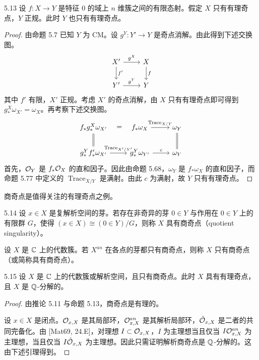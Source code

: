 
\begin{propositionp}{5.13}
设 $f\colon X\to Y$ 是特征 $0$ 的域上 $n$ 维簇之间的有限态射。假定 $X$ 只有有理奇点，$Y$ 正规。此时 $Y$ 也只有有理奇点。
\end{propositionp}

\begin{proof}
由命题 5.7 已知 $Y$ 为 CM。设 $g^Y\colon Y'\to Y$ 是奇点消解。由此得到下述交换图。
\[
\begin{tikzcd}
X' \arrow[r,"g^X"] \arrow[d,"f'"] & X \arrow[d,"f"] \\
Y' \arrow[r,"g^Y"] & Y
\end{tikzcd}
\]
其中 $f'$ 有限，$X'$ 正规。考虑 $X'$ 的奇点消解，由 $X$ 只有有理奇点即可得到 $g^X_*\omega_{X'}=\omega_X$。再考察下述交换图。
\[
\begin{tikzcd}
f_*g^X_*\omega_{X'} \arrow[r,phantom,"="] \arrow[d,equal] & f_*\omega_X \arrow[r,"\operatorname{Trace}_{X/Y}"] & \omega_Y \arrow[d,equal] \\
g^Y_*f'_*\omega_{X'} \arrow[r,"\operatorname{Trace}_{X'/Y'}"] & g^Y_*\omega_{Y'} \arrow[r,"c"] & \omega_Y
\end{tikzcd}
\]
首先，$\mathcal{O}_Y$ 是 $f_*\mathcal{O}_X$ 的直和因子。因此由命题 5.68，$\omega_Y$ 是 $f_*\omega_X$ 的直和因子，而命题 5.77 中定义的 $\operatorname{Trace}_{X/Y}$ 是满射。由此 $c$ 为满射，故 $Y$ 只有有理奇点。
\end{proof}

商奇点是值得关注的有理奇点之例。

\begin{definition}{5.14}
设 $x\in X$ 是复解析空间的芽。若存在非奇异的芽 $0\in Y$ 与作用在 $0\in Y$ 上的有限群 $G$，使得 $(x\in X)\cong(0\in Y)/G$，则称 $X$ 具有商奇点（quotient singularity）。

设 $X$ 是 $\mathbb{C}$ 上的代数簇。若 $X^{an}$ 在各点的芽都只有商奇点，则称 $X$ 只有商奇点（或简称具有商奇点）。
\end{definition}

\begin{propositionp}{5.15}
设 $X$ 是 $\mathbb{C}$ 上的代数簇或解析空间，且只有商奇点。此时 $X$ 具有有理奇点，且 $X$ 是 $\mathbb{Q}$-分解的。
\end{propositionp}

\begin{proof}
由推论 5.11 与命题 5.13，商奇点是有理的。

设 $x\in X$ 是闭点。$\mathcal{O}_{x,X}$ 是其局部环，$\mathcal{O}^{an}_{x,X}$ 是其解析局部环，$\hat{\mathcal{O}}_{x,X}$ 是二者的共同完备化。由 [Mat69, 24.E]，对理想 $I\subset\mathcal{O}_{x,X}$，$I$ 为主理想当且仅当 $I\mathcal{O}^{an}_{x,X}$ 为主理想，当且仅当 $I\hat{\mathcal{O}}_{x,X}$ 为主理想。因此只需证明解析商奇点是 $\mathbb{Q}$-分解的。这由下述引理得到。
\end{proof}

